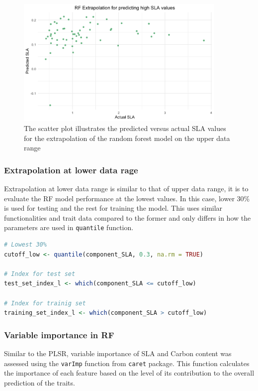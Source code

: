 \documentclass[12pt,a4paper]{report}
\begin{document}
\begin{figure}[h]
    \centering
    \includegraphics[width=0.9\textwidth]{Figures/extra_h_rf.png}
    \caption{The scatter plot illustrates the predicted versus actual SLA values for the extrapolation of the random forest model on the upper data range}
    \label{fig:extra_h_rf}
\end{figure}

\subsubsection*{Extrapolation at lower data rage}
Extrapolation at lower data range is similar to that of upper data range, it is to evaluate the RF model performance at the lowest values. In this case, lower $30\%$ is used for testing and the rest for training the model. This uses similar functionalities and trait data compared to the former and only differs in how the parameters are used in \texttt{quantile} function. \\

\begin{lstlisting}[language=R, style=mystyle]
# Lowest 30%
cutoff_low <- quantile(component_SLA, 0.3, na.rm = TRUE)

# Index for test set
test_set_index_l <- which(component_SLA <= cutoff_low)

# Index for trainig set
training_set_index_l <- which(component_SLA > cutoff_low)
\end{lstlisting}

\subsubsection{Variable importance in RF}
Similar to the PLSR, variable importance of SLA and Carbon content was assessed using the \texttt{varImp} function from \texttt{caret} package. This function calculates the importance of each feature based on the level of its contribution to the overall prediction of the traits. \\ 
\end{document}
